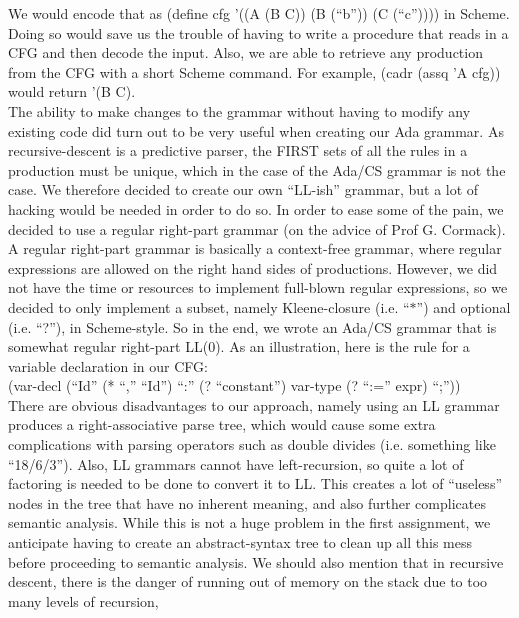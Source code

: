 \documentclass[onecolumn,11pt]{article}
\begin{document}
We would encode that as (define cfg '((A (B C)) (B (``b'')) (C (``c'')))) in Scheme. Doing so would save us the trouble of having to write a procedure that reads in a CFG and then decode the input. Also, we are able to retrieve any production from the CFG with a short Scheme command. For example, (cadr (assq 'A cfg)) would return '(B C). \\

The ability to make changes to the grammar without having to modify any existing code did turn out to be very useful when creating our Ada grammar. As recursive-descent is a predictive parser, the FIRST sets of all the rules in a production must be unique, which in the case of the Ada/CS grammar is not the case. We therefore decided to create our own ``LL-ish'' grammar, but a lot of hacking would be needed in order to do so. In order to ease some of the pain, we decided to use a regular right-part grammar (on the advice of Prof G. Cormack). A regular right-part grammar is basically a context-free grammar, where regular expressions are allowed on the right hand sides of productions. However, we did not have the time or resources to implement full-blown regular expressions, so we decided to only implement a subset, namely Kleene-closure (i.e. ``$\ast$'') and optional (i.e. ``?''), in Scheme-style. So in the end, we wrote an Ada/CS grammar that is somewhat regular right-part LL(0). As an illustration, here is the rule for a variable declaration in our CFG: \\

(var-decl (``Id'' (* ``,'' ``Id'') ``:'' (? ``constant'') var-type (? ``:='' expr) ``;'')) \\

There are obvious disadvantages to our approach, namely using an LL grammar produces a right-associative parse tree, which would cause some extra complications with parsing operators such as double divides (i.e. something like ``18/6/3''). Also, LL grammars cannot have left-recursion, so quite a lot of factoring is needed to be done to convert it to LL. This creates a lot of ``useless'' nodes in the tree that have no inherent meaning, and also further complicates semantic analysis. While this is not a huge problem in the first assignment, we anticipate having to create an abstract-syntax tree to clean up all this mess before proceeding to semantic analysis. We should also mention that in recursive descent, there is the danger of running out of memory on the stack due to too many levels of recursion, \\
\end{document}
